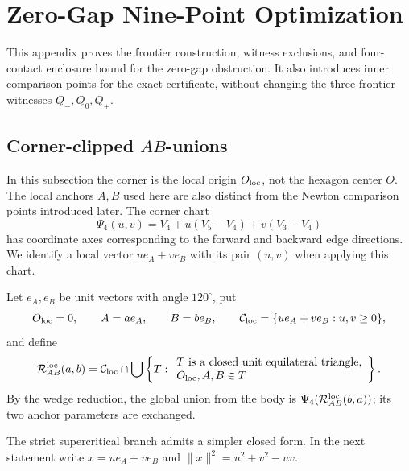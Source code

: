 \section{Zero-Gap Nine-Point Optimization}
\label{sec:zero-gap-nine-point-optimization}
\label{sec:ab-core}

This appendix proves the frontier construction, witness exclusions, and
four-contact enclosure bound for the zero-gap obstruction. It also introduces
inner comparison points for the exact certificate, without changing the
three frontier witnesses $Q_-,Q_0,Q_+$.

\subsection{Corner-clipped $AB$-unions}

In this subsection the corner is the local origin $O_{\rm loc}$, not the
hexagon center $O$. The local anchors $A,B$ used here are also distinct
from the Newton comparison points introduced later. The corner chart
\[
 \Psi_4(u,v)=V_4+u(V_5-V_4)+v(V_3-V_4)
\]
has coordinate axes corresponding to the forward and backward edge
directions. We identify a local vector $ue_A+ve_B$ with its pair $(u,v)$
when applying this chart.

Let $e_A,e_B$ be unit vectors with angle $120^\circ$, put
\[
 O_{\rm loc}=0,\qquad A=ae_A,\qquad B=be_B,
 \qquad
 \mathcal C_{\rm loc}=\{ue_A+ve_B:u,v\ge0\},
\]
and define
\begin{equation}
 \mathcal R_{AB}^{\rm loc}(a,b)=
 \mathcal C_{\rm loc}\cap\bigcup\left\{T:
 \begin{array}{l}
 T\text{ is a closed unit equilateral triangle},\\
 O_{\rm loc},A,B\in T
 \end{array}\right\}.
 \label{eq:ab-union}
\end{equation}
By the wedge reduction, the global union from the body is
$\Psi_4(\mathcal R_{AB}^{\rm loc}(b,a))$; its two anchor parameters are exchanged.

The strict supercritical branch admits a simpler closed form.  In the next
statement write $x=ue_A+ve_B$ and
$\lVert x\rVert^2=u^2+v^2-uv$.


